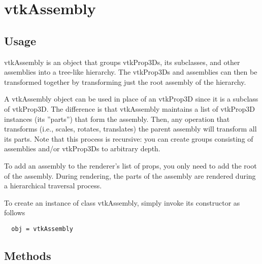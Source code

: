 \section{vtkAssembly}

\subsection{Usage}

 vtkAssembly is an object that groups vtkProp3Ds, its subclasses, and
 other assemblies into a tree-like hierarchy. The vtkProp3Ds and
 assemblies can then be transformed together by transforming just the root
 assembly of the hierarchy.

 A vtkAssembly object can be used in place of an vtkProp3D since it is a
 subclass of vtkProp3D. The difference is that vtkAssembly maintains a list
 of vtkProp3D instances (its ''parts'') that form the assembly. Then, any
 operation that transforms (i.e., scales, rotates, translates) the parent
 assembly will transform all its parts.  Note that this process is
 recursive: you can create groups consisting of assemblies and/or
 vtkProp3Ds to arbitrary depth.

 To add an assembly to the renderer's list of props, you only need to
 add the root of the assembly. During rendering, the parts of the
 assembly are rendered during a hierarchical traversal process.

To create an instance of class vtkAssembly, simply
invoke its constructor as follows
\begin{verbatim}
  obj = vtkAssembly
\end{verbatim}
\subsection{Methods}

